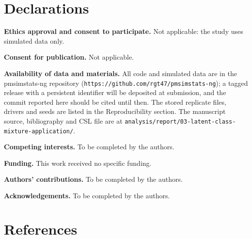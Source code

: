 \documentclass[
  11pt,
]{article}
\begin{document}
\section*{Declarations}\label{declarations}

\textbf{Ethics approval and consent to participate.} Not applicable: the
study uses simulated data only.

\textbf{Consent for publication.} Not applicable.

\textbf{Availability of data and materials.} All code and simulated data
are in the pmsimstats-ng repository
(\texttt{https://github.com/rgt47/pmsimstats-ng}); a tagged release with a
persistent identifier will be deposited at submission, and the commit
reported here should be cited until then. The stored replicate files,
drivers and seeds are listed in the Reproducibility section. The
manuscript source, bibliography and CSL file are at
\texttt{analysis/report/03-latent-class-mixture-application/}.

\textbf{Competing interests.} To be completed by the authors.

\textbf{Funding.} This work received no specific funding.

\textbf{Authors' contributions.} To be completed by the authors.

\textbf{Acknowledgements.} To be completed by the authors.

\section*{References}\label{references}
\end{document}
